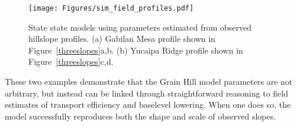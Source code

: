 \documentclass[esurf, manuscript]{copernicus}
\begin{document}
\begin{figure*}[t]
\texttt{[image: Figures/sim\_field\_profiles.pdf]}
\caption{State state models using parameters estimated from observed hillslope profiles. (a) Gabilan Mesa profile shown in Figure~\ref{threeslopes}a,b. (b) Yucaipa Ridge profile shown in Figure~\ref{threeslopes}c,d.}
\label{simprofiles}
\end{figure*}

These two examples demonstrate that the Grain Hill model parameters are not arbitrary, but instead can be linked through straightforward reasoning to field estimates of transport efficiency and baselevel lowering. When one does so, the model successfully reproduces both the shape and scale of observed slopes.

% 
%
%






\end{document}
